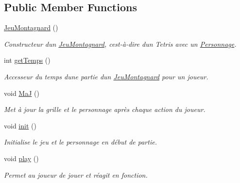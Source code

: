 \subsection*{Public Member Functions}
\begin{DoxyCompactItemize}
\item 
\mbox{\label{classJeuMontagnard_a8513eb021dbe504977de86eda36a0cac}} 
\hyperlink{classJeuMontagnard_a8513eb021dbe504977de86eda36a0cac}{Jeu\+Montagnard} ()
\begin{DoxyCompactList}\small\item\em Constructeur d\textquotesingle{}un \hyperlink{classJeuMontagnard}{Jeu\+Montagnard}, c\textquotesingle{}est-\/à-\/dire d\textquotesingle{}un Tetris avec un \hyperlink{classPersonnage}{Personnage}. \end{DoxyCompactList}\item 
int \hyperlink{classJeuMontagnard_aa4934bcc49ec59f1fd922ab6466f7a9b}{get\+Temps} ()
\begin{DoxyCompactList}\small\item\em Accesseur du temps d\textquotesingle{}une partie d\textquotesingle{}un \hyperlink{classJeuMontagnard}{Jeu\+Montagnard} pour un joueur. \end{DoxyCompactList}\item 
\mbox{\label{classJeuMontagnard_a92ee3efc9d01dcf1ab224db9f88ff907}} 
void \hyperlink{classJeuMontagnard_a92ee3efc9d01dcf1ab224db9f88ff907}{MaJ} ()
\begin{DoxyCompactList}\small\item\em Met à jour la grille et le personnage après chaque action du joueur. \end{DoxyCompactList}\item 
\mbox{\label{classJeuMontagnard_a645df2c6102b09be6cac31b94347314b}} 
void \hyperlink{classJeuMontagnard_a645df2c6102b09be6cac31b94347314b}{init} ()
\begin{DoxyCompactList}\small\item\em Initialise le jeu et le personnage en début de partie. \end{DoxyCompactList}\item 
\mbox{\label{classJeuMontagnard_a53262c982e4169ce371b8b49262ca7c8}} 
void \hyperlink{classJeuMontagnard_a53262c982e4169ce371b8b49262ca7c8}{play} ()
\begin{DoxyCompactList}\small\item\em Permet au joueur de jouer et réagit en fonction. \end{DoxyCompactList}\end{DoxyCompactItemize}


